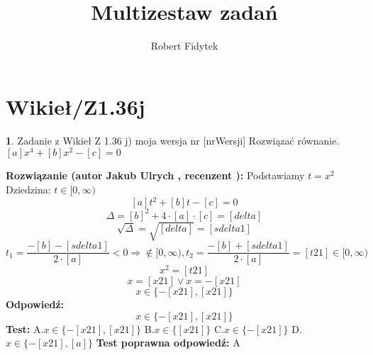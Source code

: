 \documentclass[12pt, a4paper]{article}
\title{Multizestaw zadań}
\author{Robert Fidytek}
\date{}
\theoremstyle{definition} %
\newtheorem{zad}{}
\newcommand{\kategoria}[1]{\section{#1}} %
\newcommand{\zadStart}[1]{\begin{zad}#1\newline} %
\newcommand{\zadStop}{\end{zad}}   %
\newcommand{\rozwStart}[2]{\noindent \textbf{Rozwiązanie (autor #1 , recenzent #2): }\newline} %
\newcommand{\rozwStop}{\newline}                                            %
\newcommand{\odpStart}{\noindent \textbf{Odpowiedź:}\newline}    %
\newcommand{\odpStop}{\newline}                                             %
\newcommand{\testStart}{\noindent \textbf{Test:}\newline} %
\newcommand{\testStop}{\newline} %
\newcommand{\kluczStart}{\noindent \textbf{Test poprawna odpowiedź:}\newline} %
\newcommand{\kluczStop}{\newline} %
\begin{document}
\maketitle


\kategoria{Wikieł/Z1.36j}
\zadStart{Zadanie z Wikieł Z 1.36 j) moja wersja nr [nrWersji]}
Rozwiązać równanie. $[a]x^{4}+[b]x^{2}-[c]=0$
\zadStop
\rozwStart{Jakub Ulrych}{}
Podstawiamy $t=x^{2}$\\ Dziedzina: $t\in[0,\infty)$
$$[a]t^{2}+[b]t-[c]=0$$
$$\Delta=[b]^{2}+4\cdot[a]\cdot[c]=[delta]$$
$$\sqrt{\Delta}=\sqrt{[delta]}=[sdelta1]$$
$$t_{1}=\frac{-[b]-[sdelta1]}{2\cdot[a]}<0\Rightarrow\notin[0,\infty),t_{2}=\frac{-[b]+[sdelta1]}{2\cdot[a]}=[t21]\in[0,\infty)$$
$$x^{2}=[t21]$$
$$x=[x21]\vee x=-[x21]$$
$$x\in\{-[x21],[x21]\}$$
\rozwStop
\odpStart
$$x\in\{-[x21],[x21]\}$$
\odpStop
\testStart
A.$x\in\{-[x21],[x21]\}$
B.$x\in\{[x21]\}$
C.$x\in\{-[x21]\}$
D.$x\in\{-[x21],[a]\}$
\testStop
\kluczStart
A
\kluczStop
\end{document}
